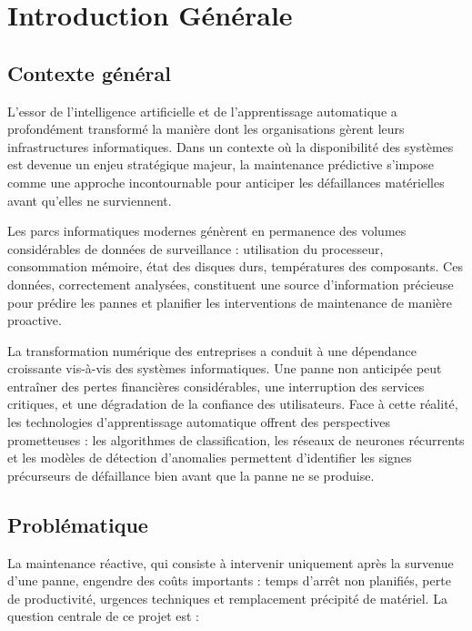 \chapter*{Introduction Générale}

\section*{Contexte général}

L'essor de l'intelligence artificielle et de l'apprentissage automatique a profondément
transformé la manière dont les organisations gèrent leurs infrastructures informatiques.
Dans un contexte où la disponibilité des systèmes est devenue un enjeu stratégique majeur,
la maintenance prédictive s'impose comme une approche incontournable pour anticiper les
défaillances matérielles avant qu'elles ne surviennent.

Les parcs informatiques modernes génèrent en permanence des volumes considérables de données
de surveillance : utilisation du processeur, consommation mémoire, état des disques durs,
températures des composants. Ces données, correctement analysées, constituent une source
d'information précieuse pour prédire les pannes et planifier les interventions de maintenance
de manière proactive.

La transformation numérique des entreprises a conduit à une dépendance croissante vis-à-vis
des systèmes informatiques. Une panne non anticipée peut entraîner des pertes financières
considérables, une interruption des services critiques, et une dégradation de la confiance
des utilisateurs. Face à cette réalité, les technologies d'apprentissage automatique offrent
des perspectives prometteuses : les algorithmes de classification, les réseaux de neurones
récurrents et les modèles de détection d'anomalies permettent d'identifier les signes
précurseurs de défaillance bien avant que la panne ne se produise.

\section*{Problématique}

La maintenance réactive, qui consiste à intervenir uniquement après la survenue d'une panne,
engendre des coûts importants : temps d'arrêt non planifiés, perte de productivité, urgences
techniques et remplacement précipité de matériel. La question centrale de ce projet est :

